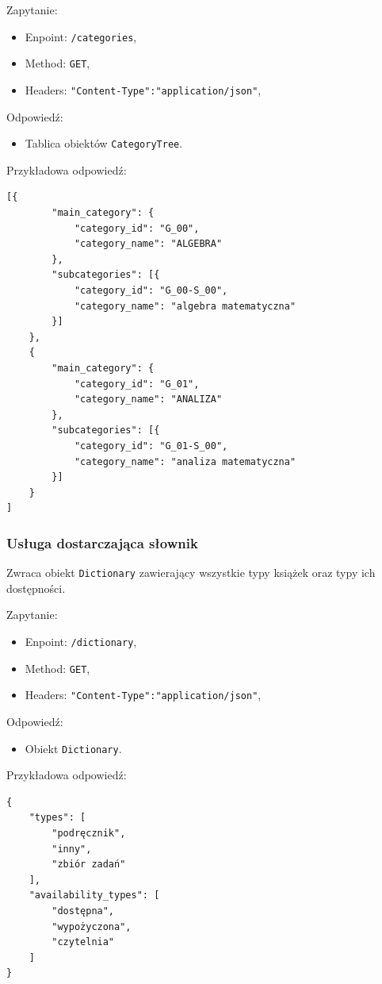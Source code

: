 \documentclass[twoside]{projektInzynierskiMS}
\begin{document}
Zapytanie:
\begin{itemize}
	\item Enpoint: \verb`/categories`,
	\item Method: \verb`GET`,
	\item Headers: \verb`"Content-Type":"application/json"`,
\end{itemize}

Odpowiedź:
\begin{itemize}
	\item Tablica obiektów \verb`CategoryTree`.
\end{itemize}

Przykładowa odpowiedź:

\begin{verbatim}
[{
        "main_category": {
            "category_id": "G_00",
            "category_name": "ALGEBRA"
        },
        "subcategories": [{
            "category_id": "G_00-S_00",
            "category_name": "algebra matematyczna"
        }]
    },
    {
        "main_category": {
            "category_id": "G_01",
            "category_name": "ANALIZA"
        },
        "subcategories": [{
            "category_id": "G_01-S_00",
            "category_name": "analiza matematyczna"
        }]
    }
]
\end{verbatim}


\subsubsection{Usługa dostarczająca słownik}
Zwraca obiekt \verb`Dictionary` zawierający wszystkie typy książek oraz typy ich dostępności.

Zapytanie:
\begin{itemize}
	\item Enpoint: \verb`/dictionary`,
	\item Method: \verb`GET`,
	\item Headers: \verb`"Content-Type":"application/json"`,
\end{itemize}

Odpowiedź:
\begin{itemize}
	\item Obiekt \verb`Dictionary`.
\end{itemize}

Przykładowa odpowiedź:

\begin{verbatim}
{
    "types": [
        "podręcznik",
        "inny",
        "zbiór zadań"
    ],
    "availability_types": [
        "dostępna",
        "wypożyczona",
        "czytelnia"
    ]
}
\end{verbatim}
\end{document}
